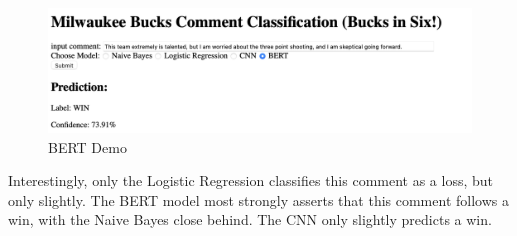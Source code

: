 \documentclass[twocolumn]{article}
\begin{document}
\begin{figure}[H]
    \centering
    \includegraphics[width=\linewidth]{BERTDEMO.png}
    \caption{BERT Demo}
\end{figure}

Interestingly, only the Logistic Regression classifies this comment as a loss, but only slightly. The BERT model most strongly asserts that this comment follows a win, with the Naive Bayes close behind. The CNN only slightly predicts a win.
\end{document}

